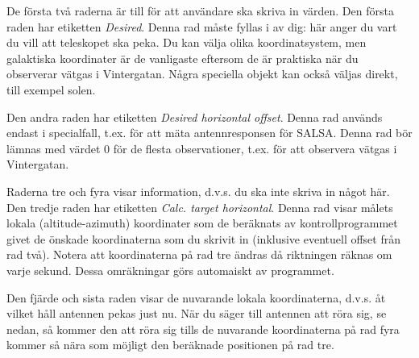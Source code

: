De första två raderna är till för att användare ska skriva in värden. Den första
raden har etiketten \emph{Desired}. Denna rad måste fyllas i av dig: här anger du
vart du vill att teleskopet ska peka. Du kan välja olika koordinatsystem, men 
galaktiska koordinater är de vanligaste eftersom de är praktiska när du observerar 
vätgas i Vintergatan. Några speciella objekt kan också väljas direkt, till exempel
solen. 

Den andra raden har etiketten \emph{Desired horizontal offset}. Denna rad
används endast i specialfall, t.ex. för att mäta antennresponsen för SALSA. Denna rad
bör lämnas med värdet 0 för de flesta observationer, t.ex. för att observera
vätgas i Vintergatan. 

Raderna tre och fyra visar information, d.v.s. du ska inte skriva in något här.
Den tredje raden har etiketten \emph{Calc. target horizontal}. Denna rad
visar målets lokala (altitude-azimuth) koordinater som de beräknats av kontrollprogrammet
givet de önskade koordinaterna som du skrivit in (inklusive eventuell offset
från rad två). Notera att koordinaterna på rad tre ändras då riktningen
räknas om varje sekund. Dessa omräkningar görs automaiskt av programmet. 

Den fjärde och sista raden visar de nuvarande lokala koordinaterna, d.v.s. 
åt vilket håll antennen pekas just nu. När du säger till antennen att röra sig, se nedan,
så kommer den att röra sig tills de nuvarande koordinaterna på rad fyra
kommer så nära som möjligt den beräknade positionen på rad tre. 


